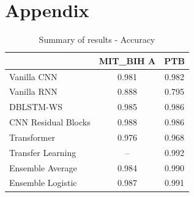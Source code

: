 \documentclass[11pt]{scrartcl}
\begin{document}
\newpage
\section{Appendix}

\begin{table}[ht]
\centering
\caption{Summary of results - Accuracy}
\begin{tabular}[t]{lcc}
\toprule
&MIT\_BIH A&PTB\\
\midrule
Vanilla CNN &0.981&0.982\\
Vanilla RNN & 0.888 & 0.795 \\
DBLSTM-WS & 0.985 & 0.986 \\
CNN Residual Blocks&0.988&0.986\\
Transformer&0.976&0.968\\
Transfer Learning & -- & 0.992 \\
Ensemble Average&0.984&0.990\\
Ensemble Logistic&0.987&0.991\\
\bottomrule
\end{tabular}
\end{table}
\end{document}
